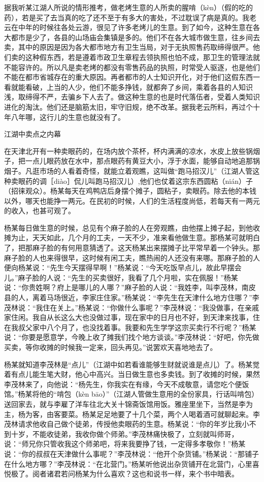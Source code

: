 \documentclass[12pt,UTF8]{ctexbook}
\begin{document}
据我听某江湖人所说的情形推考，做老烤生意的人所卖的腥啃（kèn）（假的吃的药），若是买了去当真的吃了还不至于有多大的害处，不过耽误了病是真的。我老云在中年的时候往各处云游，很见了许多老烤儿的生意。到了如今，这种生意在各大都市是少了，各县的山场庙会集镇是多的。他们不在各大城市做生意，往乡间去卖，其中的原因是因为各大都市地方有卫生当局，对于无执照售药取缔得很严。他们卖的这种假东西，若是遵着市政卫生章程去领执照也怕不成，那卫生的管理法就不能容许的。所以凡是卖老烤的都没有零售药品的执照，时常受人驱逐，也是他们不能在都市省城存在的重大原因。再者都市的人士知识开化，对于他们这假东西一看就能看破，上当的人少，他们不能多挣钱，就都奔了乡间，乘着各县的人知识浅，取缔得不严，去骗乡下人去了。做这种生意的也是时代落伍者，受着人类知识进化的淘汰。他们还是脑筋太旧，牢守旧规，绝不改革。据我老云所料，再过个十年八年哪，这行儿的生意也就没有了。





江湖中卖点之内幕


在天津北开有一种卖眼药的，在场内放个茶杯，杯内满满的凉水，水皮上放些锅烟子，把一点儿眼药放在水中，那点眼药有黄豆大小，浮于水面，能够自动地追那锅烟子。凡逛市场的人看着奇怪，就能立着观瞧，这叫做“跑马招汉儿”（江湖人管这种卖眼药的调［diào］侃儿叫跑马招汉儿）,他们也仗着这宗东西圆粘（nián）子（招徕观众）。杨某每天在鸡鸭店后身摆个摊子，圆粘子，卖眼药。除去他的本钱以外，哪天也能挣一两元。在民初的时候，人们的生活程度尚低，若每天有一两元的收入，也甚可观了。

杨某每日做生意的时候，总见有个麻子脸的人在旁观瞧，由他摆上摊子起，到他收摊为止，天天如此，几个月的工夫，一天不少，准来看他做生意。那杨某可就明白了，把那麻子脸的有何用意猜透了。这天杨某出来摆摊子比平常早着一个钟头。那麻子脸的人也来得很早，这时候有闲工夫，瞧热闹的人还没有来哪。那麻子脸的人便向杨某说：“先生今天摆得早啊！”杨某说：“今天吃饭早点儿，故此早摆会儿。”麻子脸的人说：“先生的买卖很好，我看了几个月啦，实在佩服！”杨某说：“你贵姓啊？府上是哪儿的人哪？”麻子脸的人说：“我姓李，叫李茂林，南皮县的人，离着马场很近，李家庄住家。”杨某说：“李先生在天津什么地方住哪？”李茂林说：“我住在关上。”杨某说：“你做什么事呢？”李茂林说：“我没做事，在亲戚家住闲。我自从长这么大也没做过事，现在家中的日月也不好，到天津来找事，住在我叔父家中八个月了，也没找着事。我要和先生学学这宗买卖行不行呢？”杨某说：“你要是愿意学，今晚上收了摊我们找个地方谈谈。”李茂林说：“好吧，你先做买卖，等你收摊的时候我一定来，回头再见。”说罢欢天喜地地去了。

杨某就知道李茂林是“点儿”（江湖中如若看谁能够生财就说谁是点儿）了。杨某觉着有点儿能生笔大财，他心中高兴。当日做生意也多卖钱。到了收摊的时候，果然李茂林来了，向他说：“杨先生，你我实在有缘，今天不成敬意，请您吃个便饭馆。”杨某将他的“啃包（kèn bāo）”（江湖人管做生意用的全份家具，行话叫啃包）送回家去，就与李雇了洋车往北大关十锦斋饭馆用饭。雅座里坐下，当然是李为主，杨为客，由客要菜。杨某足足地要了十几个菜，两个人喝着酒可就聊起来。李茂林请求他收自己做个徒弟，传授他卖眼药的生意。杨某说：“你的年岁比我小不到十岁，不能收徒弟，我收你做个师弟。”李茂林痛快极了，立刻就叫师哥，说：“师兄你只管收我这个师弟吧，将来我要挣了钱，一定得多孝敬你！”杨某说：“你的叔叔在天津做什么事呢？”李茂林说：“他开个杂货铺。”杨某说：“那铺子在什么地方哪？”李茂林说：“在北营门。”杨某听他说出杂货铺开在北营门，心里喜悦极了。阅者诸君若问杨某为什么喜欢？这也和说书一样，来个书中暗表。
\end{document}
